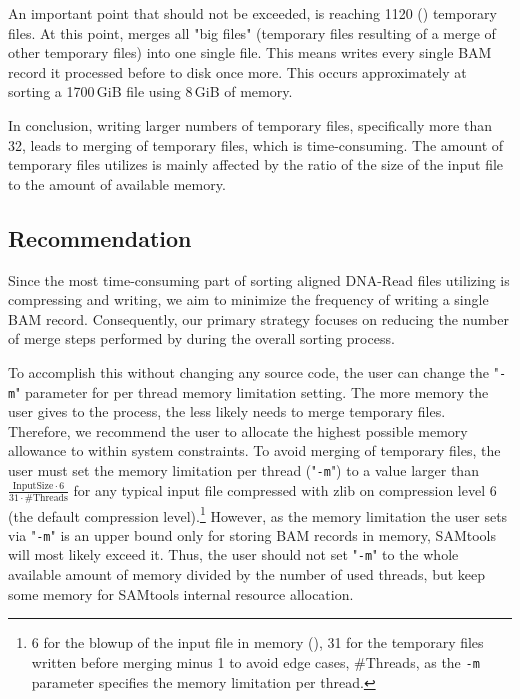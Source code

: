 An important point that should not be exceeded, is reaching 1120 () temporary files. At this point, \sort merges all "big files" (temporary files resulting of a merge of other temporary files) into one single file. This means \sort writes every single BAM record it processed before to disk once more. This occurs approximately at sorting a 1700\,GiB file using 8\,GiB of memory.

In conclusion, writing larger numbers of temporary files, specifically more than 32, leads to merging of temporary files, which is time-consuming. The amount of temporary files \sort utilizes is mainly affected by the ratio of the size of the input file to the amount of available memory.

\subsection{Recommendation}

Since the most time-consuming part of sorting aligned DNA-Read files utilizing \sort is compressing and writing, we aim to minimize the frequency of \sort writing a single BAM record. Consequently, our primary strategy focuses on reducing the number of merge steps performed by \sort during the overall sorting process.

To accomplish this without changing any source code, the user can change the "\texttt{-m}" parameter for per thread memory limitation setting. The more memory the user gives to the process, the less likely \sort needs to merge temporary files. Therefore, we recommend the user to allocate the highest possible memory allowance to \sort within system constraints. To avoid merging of temporary files, the user must set the memory limitation per thread ("\texttt{-m}") to a value larger than $\frac{\text{InputSize} \cdot 6}{31 \cdot \text{\#Threads}} $ for any typical input file compressed with zlib on compression level 6 (the default compression level).\footnote{6 for the blowup of the input file in memory (), 31 for the temporary files written before merging minus 1 to avoid edge cases, \#Threads, as the \texttt{-m} parameter specifies the memory limitation per thread.} However, as the memory limitation the user sets via "\texttt{-m}" is an upper bound only for storing BAM records in memory, SAMtools will most likely exceed it. Thus, the user should not set "\texttt{-m}" to the whole available amount of memory divided by the number of used threads, but keep some memory for SAMtools internal resource allocation. 

